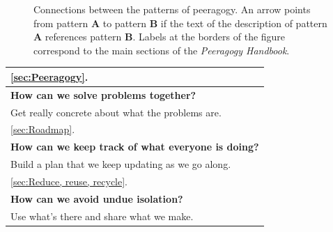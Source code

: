 \begin{figure}
\vspace{-.9in}
{\centering


\par
}
\vspace{-.9in}
\caption{Connections between the patterns of peeragogy.  An arrow points from pattern \textbf{A} to pattern \textbf{B} if the text of the description of pattern \textbf{A} references pattern \textbf{B}.  Labels at the borders of the figure correspond to the main sections of the \emph{Peeragogy Handbook}.\label{fig:connections}}
\end{figure}

\begin{table}
{\footnotesize
{}
\begin{tabularx}{\textwidth}{|C|}
\hline
\vspace{-.4em} \color{Black} \ref{sec:Peeragogy}. \vspace{.25em}\\
\hline
\vspace{.01em}
\textbf{How can we solve problems together?}\\
Get really concrete about what the problems are.
\vspace{.4em}\\
\hline 
\vspace{-.4em} \color{Black} \ref{sec:Roadmap}. \vspace{.4em}\\
\hline
\vspace{.01em}
\textbf{How can we keep track of what everyone is doing?}\\
Build a plan that we keep updating as we go along.
\vspace{.4em}\\
\hline
\vspace{-.4em} \color{Black} \ref{sec:Reduce, reuse, recycle}. \vspace{.4em}\\
\hline
\vspace{.01em}
\textbf{How can we avoid undue isolation?}\\
Use what's there and share what we make.
\vspace{.4em}\\
\hline

\end{tabularx}}
\end{table}
